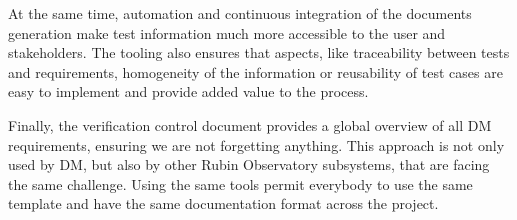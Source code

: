 At the same time, automation and continuous integration of the documents generation make test information
much more accessible to the user and stakeholders.
The tooling also ensures that aspects, like traceability between tests and requirements, homogeneity of the information 
or reusability of test cases are easy to implement and provide added value to the process.

Finally, the verification control document provides a global overview of all DM requirements, ensuring we are not forgetting anything.
This approach is not only used by DM, but also by other Rubin Observatory subsystems, that are facing the same challenge.
Using the same tools permit everybody to use the same template and have the same documentation format across the project.



